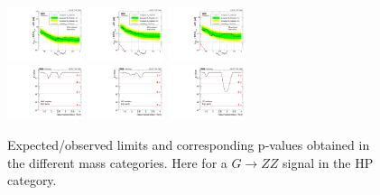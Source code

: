 \begin{figure}[h!]
\centering
\includegraphics[width=0.20\textwidth]{figures/analysis/search1/AN-15-211/limits/brazilianFlag_BulkZZ_WWHP_13TeV_wPDF.pdf}
\includegraphics[width=0.20\textwidth]{figures/analysis/search1/AN-15-211/limits/brazilianFlag_BulkZZ_WZHP_13TeV_wPDF.pdf}
\includegraphics[width=0.20\textwidth]{figures/analysis/search1/AN-15-211/limits/brazilianFlag_BulkZZ_ZZHP_13TeV_wPDF.pdf}\\
\includegraphics[width=0.20\textwidth]{figures/analysis/search1/AN-15-211/pvalues/pvalue_BulkZZinWW_high_purity.pdf}
\includegraphics[width=0.20\textwidth]{figures/analysis/search1/AN-15-211/pvalues/pvalue_BulkZZinWZ_high_purity.pdf}
\includegraphics[width=0.20\textwidth]{figures/analysis/search1/AN-15-211/pvalues/pvalue_BulkZZinZZ_high_purity.pdf}
\caption{Expected/observed limits and corresponding p-values obtained in the different mass categories. Here for a $G\rightarrow ZZ$ signal in the HP category.}
\label{fig:searchI:Limits_HPBulkZZ}
\end{figure}

